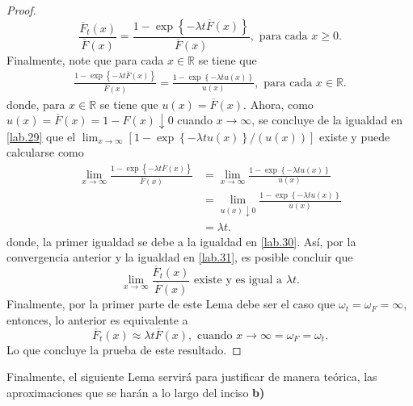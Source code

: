 \documentclass[10.5pt,notitlepage]{article}
\newcommand{\RR}{\mathbb{R}}
\newcommand{\kis}[1]{\left\{ #1 \right\}}
\theoremstyle{plain}
\begin{document}
\begin{proof}
\begin{equation}\label{lab.31}
\frac{\overline{F}_{t}(x)}{\overline{F}(x)} = \frac{ 1- \exp\kis{-\lambda t\overline{F}(x)}}{\overline{F}(x)}, \text{ para cada } x\geq 0.    
\end{equation}
Finalmente, note que para cada \(x \in \RR\) se tiene que  
\begin{align}\label{lab.30}
    \frac{ 1- \exp\kis{-\lambda t\overline{F}(x)}}{\overline{F}(x)} =  \frac{ 1- \exp\kis{-\lambda tu(x)}}{u(x)}, \text{ para cada } x \in \RR.
\end{align}
donde, para \(x\in \RR\) se tiene que \(u(x) = \overline{F}(x)\). Ahora, como \(u(x) = \overline{F}(x) = 1- F(x) \downarrow 0\) cuando \(x \to \infty\), se concluye de la igualdad en \eqref{lab.29} que el \(\lim_{x \to \infty} [1- \exp\kis{-\lambda tu(x)}/(u(x))]\) existe y puede calcularse como 
\begin{align*}
    \lim_{x \to \infty}\frac{ 1- \exp\kis{-\lambda t\overline{F}(x)}}{\overline{F}(x)} &= \lim_{x \to \infty}\frac{ 1- \exp\kis{-\lambda tu(x)}}{u(x)}\\ 
                                                                                       &= \lim_{u(x) \downarrow 0}\frac{ 1- \exp\kis{-\lambda tu(x)}}{u(x)}\\
                                                                                       &= \lambda t.
\end{align*}
donde, la primer igualdad se debe a la igualdad en \eqref{lab.30}. Así, por la convergencia anterior y la igualdad en \eqref{lab.31}, es posible concluir que 
\[
\lim_{x\to \infty}\frac{\overline{F}_{t}(x)}{\overline{F}(x)} \text{ existe y es igual a } \lambda t.
\]
Finalmente, por la primer parte de este Lema debe ser el caso que \(\omega_t = \omega_F = \infty\), entonces, lo anterior es equivalente a 
\[
\overline{F}_{t}(x) \approx \lambda t \overline{F}(x), \text{ cuando } x \to \infty =\omega_{F} = \omega_{t}.
\]
Lo que concluye la prueba de este resultado.
\end{proof}
Finalmente, el siguiente Lema servirá para justificar de manera teórica, las aproximaciones que se harán a lo largo del inciso \textbf{b)}
\end{document}
